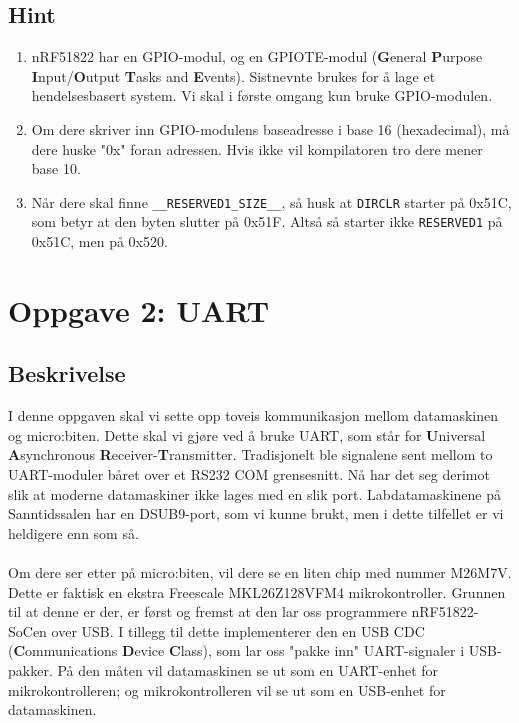 \documentclass[11pt,a4paper]{article}
\begin{document}
\subsection{Hint}
\begin{enumerate}
\item nRF51822 har en GPIO-modul, og en GPIOTE-modul (\textbf{G}eneral \textbf{P}urpose \textbf{I}nput/\textbf{O}utput \textbf{T}asks and \textbf{E}vents). Sistnevnte brukes for å lage et hendelsesbasert system. Vi skal i første omgang kun bruke GPIO-modulen.
\item Om dere skriver inn GPIO-modulens baseadresse i base 16 (hexadecimal), må dere huske "0x" foran adressen. Hvis ikke vil kompilatoren tro dere mener base 10.
\item Når dere skal finne \texttt{__RESERVED1_SIZE__}, så husk at \texttt{DIRCLR} starter på 0x51C, som betyr at den byten slutter på 0x51F. Altså så starter ikke \texttt{RESERVED1} på 0x51C, men på 0x520.
\end{enumerate}

\section{Oppgave 2: UART}
\subsection{Beskrivelse}
I denne oppgaven skal vi sette opp toveis kommunikasjon mellom datamaskinen og micro:biten. Dette skal vi gjøre ved å bruke UART, som står for \textbf{U}niversal \textbf{A}synchronous \textbf{R}eceiver-\textbf{T}ransmitter. Tradisjonelt ble signalene sent mellom to UART-moduler båret over et RS232 COM grensesnitt. Nå har det seg derimot slik at moderne datamaskiner ikke lages med en slik port. Labdatamaskinene på Sanntidssalen har en DSUB9-port, som vi kunne brukt, men i dette tilfellet er vi heldigere enn som så.\\
\\
Om dere ser etter på micro:biten, vil dere se en liten chip med nummer M26M7V. Dette er faktisk en ekstra Freescale MKL26Z128VFM4 mikrokontroller. Grunnen til at denne er der, er først og fremst at den lar oss programmere nRF51822-SoCen over USB. I tillegg til dette implementerer den en USB CDC (\textbf{C}ommunications \textbf{D}evice \textbf{C}lass), som lar oss "pakke inn" UART-signaler i USB-pakker. På den måten vil datamaskinen se ut som en UART-enhet for mikrokontrolleren; og mikrokontrolleren vil se ut som en USB-enhet for datamaskinen.
\end{document}
